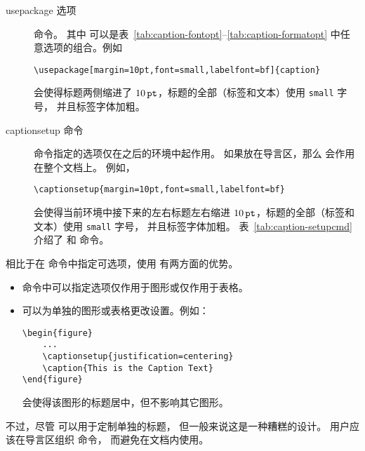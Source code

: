 \begin{description}
	\item[usepackage 选项] 
	
	 命令。
	其中 \opt{[options]} 可以是表~\ref{tab:caption-fontopt}--\ref{tab:caption-formatopt} 中任意选项的组合。例如
\begin{lstlisting}
\usepackage[margin=10pt,font=small,labelfont=bf]{caption}
\end{lstlisting}
	会使得标题两侧缩进了 $10\,\mathtt{pt}$，标题的全部（标签和文本）使用 \texttt{small} 字号，
	并且标签字体加粗。
	
	\item[captionsetup 命令]
	
	 命令指定的选项仅在之后的环境中起作用。
	如果放在导言区，那么  会作用在整个文档上。
	例如，
\begin{lstlisting}
\captionsetup{margin=10pt,font=small,labelfont=bf}
\end{lstlisting}
	会使得当前环境中接下来的左右标题左右缩进 $10\,\mathtt{pt}$，标题的全部（标签和文本）使用 \texttt{small} 字号，
	并且标签字体加粗。
	表~\ref{tab:caption-setupcmd} 介绍了  和  命令。
\end{description}

相比于在  命令中指定可选项，使用  有两方面的优势。
\begin{itemize}
	\item {} 命令中可以指定选项仅作用于图形或仅作用于表格。
	\item {} 可以为单独的图形或表格更改设置。例如：
\begin{lstlisting}
\begin{figure}
	...
	\captionsetup{justification=centering}
	\caption{This is the Caption Text}
\end{figure}
\end{lstlisting}
	会使得该图形的标题居中，但不影响其它图形。
\end{itemize}
不过，尽管  可以用于定制单独的标题，
但一般来说这是一种糟糕的设计。
用户应该在导言区组织  命令，
而避免在文档内使用。

